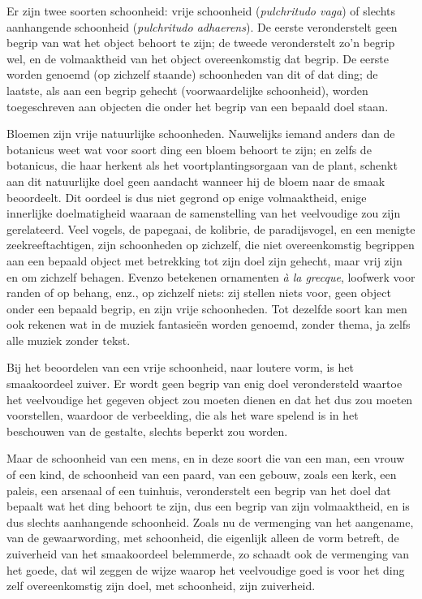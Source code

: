 Er zijn twee soorten schoonheid: vrije schoonheid (\emph{pulchritudo vaga}) of slechts aanhangende schoonheid (\emph{pulchritudo adhaerens}). De eerste veronderstelt geen begrip van wat het object behoort te zijn; de tweede veronderstelt zo’n begrip wel, en de volmaaktheid van het object overeenkomstig dat begrip. De eerste worden genoemd (op zichzelf staande) schoonheden van dit of dat ding; de laatste, als aan een begrip gehecht (voorwaardelijke schoonheid), worden toegeschreven aan objecten die onder het begrip van een bepaald doel staan.

Bloemen zijn vrije natuurlijke schoonheden. Nauwelijks iemand anders dan de botanicus weet wat voor soort ding een bloem behoort te zijn; en zelfs de botanicus, die haar herkent als het voortplantingsorgaan van de plant, schenkt aan dit natuurlijke doel geen aandacht wanneer hij de bloem naar de smaak beoordeelt. Dit oordeel is dus niet gegrond op enige volmaaktheid, enige innerlijke doelmatigheid waaraan de samenstelling van het veelvoudige zou zijn gerelateerd. Veel vogels, de papegaai, de kolibrie, de paradijsvogel, en een menigte zeekreeftachtigen, zijn schoonheden op zichzelf, die niet overeenkomstig begrippen aan een bepaald object met betrekking tot zijn doel zijn gehecht, maar vrij zijn en om zichzelf behagen. Evenzo betekenen ornamenten \emph{à la grecque}, loofwerk voor randen of op behang, enz., op zichzelf niets: zij stellen niets voor, geen object onder een bepaald begrip, en zijn vrije schoonheden. Tot dezelfde soort kan men ook rekenen wat in de muziek fantasieën worden genoemd, zonder thema, ja zelfs alle muziek zonder tekst.

Bij het beoordelen van een vrije schoonheid, naar loutere vorm, is het smaakoordeel zuiver. Er wordt geen begrip van enig doel verondersteld waartoe het veelvoudige het gegeven object zou moeten dienen en dat het dus zou moeten voorstellen, waardoor de verbeelding, die als het ware spelend is in het beschouwen van de gestalte, slechts beperkt zou worden.

Maar de schoonheid van een mens, en in deze soort die van een man, een vrouw of een kind, de schoonheid van een paard, van een gebouw, zoals een kerk, een paleis, een arsenaal of een tuinhuis, veronderstelt een begrip van het doel dat bepaalt wat het ding behoort te zijn, dus een begrip van zijn volmaaktheid, en is dus slechts aanhangende schoonheid. Zoals nu de vermenging van het aangename, van de gewaarwording, met schoonheid, die eigenlijk alleen de vorm betreft, de zuiverheid van het smaakoordeel belemmerde, zo schaadt ook de vermenging van het goede, dat wil zeggen de wijze waarop het veelvoudige goed is voor het ding zelf overeenkomstig zijn doel, met schoonheid, zijn zuiverheid.


